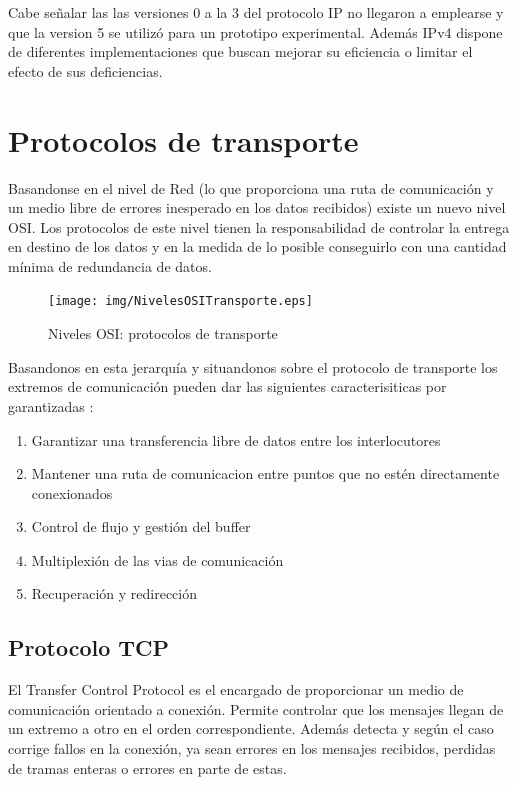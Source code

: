 \documentclass[a4paper,spanish,12pt]{book}
\begin{document}
Cabe señalar las las versiones 0 a la 3 del protocolo IP no llegaron a emplearse  y que la version 5 se utilizó para un prototipo experimental. Además IPv4 dispone de diferentes implementaciones que buscan mejorar su eficiencia o limitar el efecto de sus deficiencias.

\section{Protocolos de transporte}

Basandonse en el nivel de Red (lo que proporciona una ruta de comunicación y un medio libre de errores inesperado en los datos recibidos) existe un nuevo nivel OSI. Los protocolos de este nivel tienen la responsabilidad de controlar la entrega en destino de los datos y en la medida de lo posible conseguirlo con una cantidad mínima de redundancia de datos.

\begin{figure}
	\texttt{[image: img/NivelesOSITransporte.eps]}	
              \caption{Niveles OSI: protocolos de transporte}
  \label{fig:nivelesOSITransporte}
\end{figure}

Basandonos en esta jerarquía y situandonos sobre el protocolo de transporte los extremos de comunicación pueden dar las siguientes caracterisiticas por garantizadas :
\begin{enumerate}
	\item{Garantizar una transferencia libre de datos entre los interlocutores}
	\item{Mantener una ruta de comunicacion entre puntos que no est\'en directamente conexionados}
	\item{Control de flujo y gestión del buffer}
	\item{Multiplexión de las vias de comunicación}
	\item{Recuperación y redirección}
\end{enumerate}
\subsection{Protocolo TCP}
El Transfer Control Protocol es el encargado de proporcionar un medio de comunicación orientado a conexión. Permite controlar que los mensajes llegan de un extremo a otro en el orden correspondiente. Además detecta y según el caso corrige fallos en la conexión, ya sean errores en los mensajes recibidos, perdidas de tramas enteras o errores en parte de estas.
\end{document}
